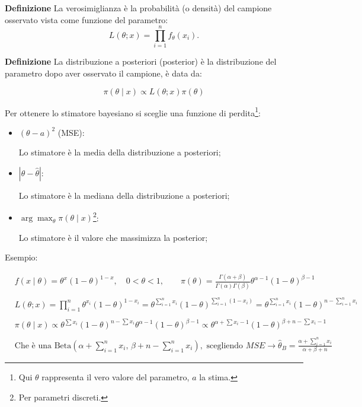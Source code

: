 \documentclass{article}
\newcommand{\df}{\noindent\textbf{Definizione} }
\begin{document}
\df La verosimiglianza è la probabilità (o densità) del campione osservato vista come funzione del parametro: \[ L(\theta;x)=\prod_{i=1}^{n}f_\theta(x_i). \]

\df La distribuzione a posteriori (posterior) è la distribuzione del parametro dopo aver osservato il campione, è data da:

\[
\pi(\theta\mid x)\propto
L(\theta;x)\pi(\theta)
\]\newline

Per ottenere lo stimatore bayesiano si sceglie una funzione di perdita\footnote{Qui $\theta$ rappresenta il vero valore del parametro, $a$ la stima.}:

\begin{itemize}
\item \textbf{$(\theta-a)^2$} (MSE):

    Lo stimatore è la media della distribuzione a posteriori;

\item \textbf{$|\theta-\hat{\theta}|$}:

    Lo stimatore è la mediana della distribuzione a posteriori;

\item \textbf{$\arg\max_\theta \pi(\theta\mid x)$}\footnote{Per parametri discreti.}:

    Lo stimatore è il valore che massimizza la posterior;

\end{itemize}

\vspace{6pt}

Esempio:

\begin{align*}
&f(x\mid\theta)=\theta^{x}(1-\theta)^{1-x},
\quad 0<\theta<1,\qquad
\pi(\theta)=\frac{\Gamma(\alpha+\beta)}
{\Gamma(\alpha)\Gamma(\beta)}
\theta^{\alpha-1}(1-\theta)^{\beta-1}\\
\\
&L(\theta;x)
=\prod_{i=1}^{n}
\theta^{x_i}(1-\theta)^{1-x_i}=
\theta^{\sum_{i=1}^{n}x_i}
(1-\theta)^{\sum_{i=1}^{n}(1-x_i)}=
\theta^{\sum_{i=1}^{n}x_i}
(1-\theta)^{n-\sum_{i=1}^{n}x_i}\\
\\
&\pi(\theta\mid x)
\propto
\theta^{\sum x_i}
(1-\theta)^{n-\sum x_i}
\theta^{\alpha-1}
(1-\theta)^{\beta-1}
\propto
\theta^{\alpha+\sum x_i-1}
(1-\theta)^{\beta+n-\sum x_i-1}\\
\\
&\text{Che è una }\mathrm{Beta}
\left(
\alpha+\sum_{i=1}^{n}x_i,\,
\beta+n-\sum_{i=1}^{n}x_i
\right), \text{ scegliendo } MSE\rightarrow \hat{\theta}_B=\frac{\alpha+\sum_{i=1}^{n}x_i}{\alpha+\beta+n}
\end{align*}\newline
\end{document}
